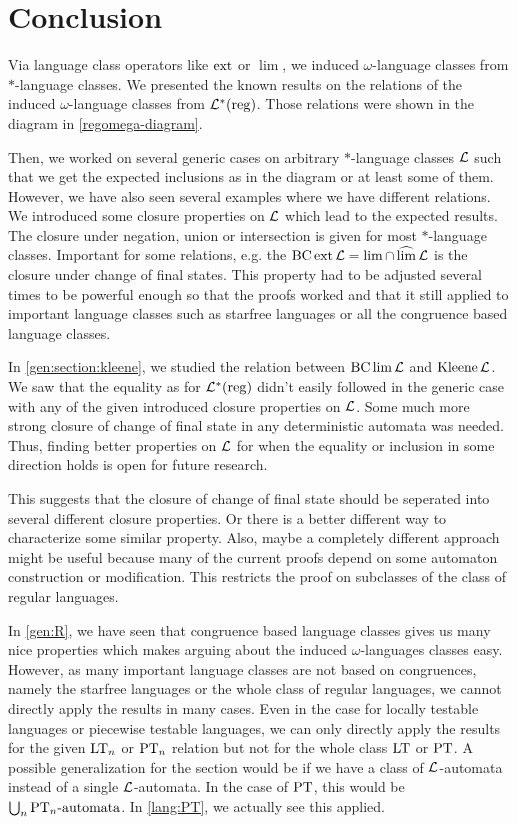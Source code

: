 \section{Conclusion}
\label{chapter:conclusion}

Via language class operators like $\operatorname{ext}$ or $\lim$, we induced $\omega$-language classes from $*$-language classes. We presented the known results on the relations of the induced $\omega$-language classes from $\mathcal{L}^*(\textup{\textrm{reg}})$. Those relations were shown in the diagram in \cref{regomega-diagram}.

Then, we worked on several generic cases on arbitrary $*$-language classes $\mathcal{L}$ such that we get the expected inclusions as in the diagram or at least some of them. However, we have also seen several examples where we have different relations. We introduced some closure properties on $\mathcal{L}$ which lead to the expected results. The closure under negation, union or intersection is given for most $*$-language classes. Important for some relations, e.g. the $\operatorname{BC} \operatorname{ext} \mathcal{L} = \lim \cap \operatorname{\widehat{lim}} \mathcal{L}$ is the closure under change of final states. This property had to be adjusted several times to be powerful enough so that the proofs worked and that it still applied to important language classes such as starfree languages or all the congruence based language classes.

In \cref{gen:section:kleene}, we studied the relation between $\operatorname{BC} \lim \mathcal{L}$ and $\operatorname{Kleene} \mathcal{L}$. We saw that the equality as for $\mathcal{L}^*(\textup{\textrm{reg}})$ didn't easily followed in the generic case with any of the given introduced closure properties on $\mathcal{L}$. Some much more strong closure of change of final state in any deterministic automata was needed. Thus, finding better properties on $\mathcal{L}$ for when the equality or inclusion in some direction holds is open for future research.

This suggests that the closure of change of final state should be seperated into several different closure properties. Or there is a better different way to characterize some similar property. Also, maybe a completely different approach might be useful because many of the current proofs depend on some automaton construction or modification. This restricts the proof on subclasses of the class of regular languages.

In \cref{gen:R}, we have seen that congruence based language classes gives us many nice properties which makes arguing about the induced $\omega$-languages classes easy. However, as many important language classes are not based on congruences, namely the starfree languages or the whole class of regular languages, we cannot directly apply the results in many cases. Even in the case for locally testable languages or piecewise testable languages, we can only directly apply the results for the given $\textup{\textrm{LT}}_n$ or $\textup{\textrm{PT}}_n$ relation but not for the whole class $\textup{\textrm{LT}}$ or $\textup{\textrm{PT}}$. A possible generalization for the section would be if we have a class of $\mathcal{L}$-automata instead of a single $\mathcal{L}$-automata. In the case of $\textup{\textrm{PT}}$, this would be $\bigcup_n \text{$\textup{\textrm{PT}}_n$-automata}$. In \cref{lang:PT}, we actually see this applied.

